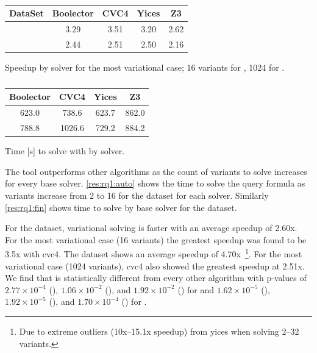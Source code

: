 \begin{table}
  \begin{subtable}[t]{0.45\textwidth}
    \centering
    \begin{tabular}{c || c | c | c | c}
      DataSet    & Boolector & CVC4 & Yices & Z3 \\
      \hline
      \auto{}    & 3.29      & 3.51 & 3.20  & 2.62 \\
      \fin{}     & 2.44      & 2.51 & 2.50  & 2.16 \\
    \end{tabular}
    \caption{Speedup by solver for the most variational case; 16 variants for
      \auto{}, 1024 for \fin{}.}%
    \label{tab:rq1:speedup}
  \end{subtable}
  \hfill
  \begin{subtable}[t]{0.45\textwidth}
    \centering
    \begin{tabular}{ c | c | c | c}
      Boolector & CVC4 & Yices & Z3 \\
      \hline
       623.0    & 738.6 & 623.7 & 862.0 \\
       788.8     & 1026.6 & 729.2  & 884.2 \\
    \end{tabular}
    \caption{Time [s] to solve with \vTov{} by solver.}%
    \label{tab:rq1:comparison}
  \end{subtable}
  \caption{}%
  \label{tab:rq1}
\end{table}

The \vsat{} tool outperforms other algorithms as the count of variants to solve
increases for every base solver. \autoref{res:rq1:auto} shows the time to solve
the query formula as variants increase from 2 to 16 for the \auto{} dataset for
each solver. Similarly \autoref{res:rq1:fin} shows time to solve by base solver
for the \fin{} dataset.

For the \auto{} dataset, variational solving is faster with an average speedup
of 2.60x. For the most variational case (16 variants) the greatest speedup was
found to be 3.5x with cvc4. The \fin{} dataset shows an average speedup of
4.70x~\footnote{Due to extreme outliers (10x--15.1x speedup) from yices when
  solving 2--32 variants.}. For the most variational case (1024 variants), cvc4
also showed the greatest speedup at 2.51x. We find that \vTov{} is statistically
different from every other algorithm with p-values of $2.77\times 10^{-4}$
(\vTop{}), $1.06\times 10^{-2}$ (\pTop{}), and $1.92\times 10^{-2}$ (\pTov{})
for \auto{} and $1.62\times 10^{-5}$ (\vTop{}), $1.92\times 10^{-5}$ (\pTop{}),
and $1.70\times 10^{-4}$ (\pTov{}) for \fin{}.

